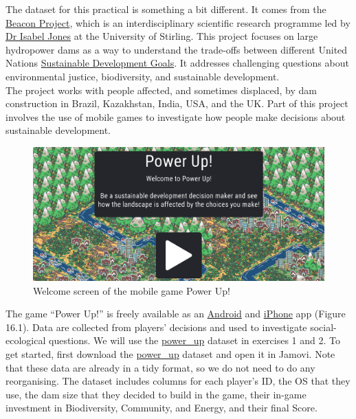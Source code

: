 \documentclass[
]{scrbook}
\begin{document}
The dataset for this practical is something a bit different.
It comes from the \href{https://www.thebeaconproject.net/}{Beacon Project}, which is an interdisciplinary scientific research programme led by \href{https://www.stir.ac.uk/people/256518}{Dr Isabel Jones} at the University of Stirling.
This project focuses on large hydropower dams as a way to understand the trade-offs between different United Nations \href{https://sdgs.un.org/goals}{Sustainable Development Goals}.
It addresses challenging questions about environmental justice, biodiversity, and sustainable development.\\
The project works with people affected, and sometimes displaced, by dam construction in Brazil, Kazakhstan, India, USA, and the UK.
Part of this project involves the use of mobile games to investigate how people make decisions about sustainable development.

\begin{figure}
\includegraphics[width=0.8\linewidth]{img/power_up} \caption{Welcome screen of the mobile game Power Up!}\label{fig:unnamed-chunk-69}
\end{figure}

The game ``Power Up!'' is freely available as an \href{https://play.google.com/store/apps/details?id=com.hyperluminal.stirlinguniversity.sustainabledevelopmentgame}{Android} and \href{https://apps.apple.com/gb/app/power-up/id1585634888}{iPhone} app (Figure 16.1).
Data are collected from players' decisions and used to investigate social-ecological questions.
We will use the \href{https://raw.githubusercontent.com/bradduthie/statistical_techniques/main/data/power_up.csv}{power\_up} dataset in exercises 1 and 2.
To get started, first download the \href{https://raw.githubusercontent.com/bradduthie/statistical_techniques/main/data/power_up.csv}{power\_up} dataset and open it in Jamovi.
Note that these data are already in a tidy format, so we do not need to do any reorganising.
The dataset includes columns for each player's ID, the OS that they use, the dam size that they decided to build in the game, their in-game investment in Biodiversity, Community, and Energy, and their final Score.
\end{document}
